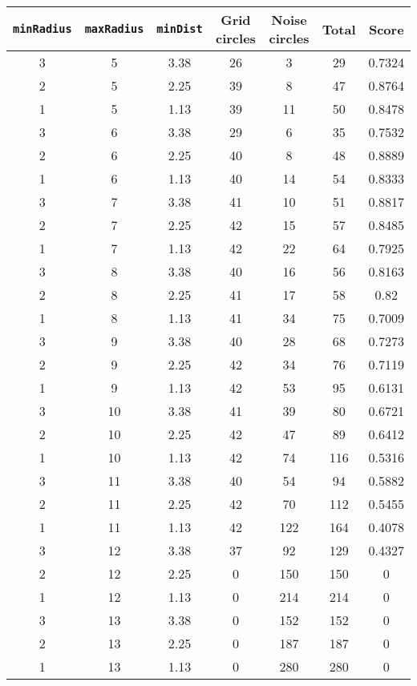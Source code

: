 \documentclass[letterpaper, 12pt]{article}
\begin{document}
\begin{longtable}{|c|c|c|c|c|c|c|}
\hline
\textbf{\texttt{minRadius}} & \textbf{\texttt{maxRadius}} & \textbf{\texttt{minDist}} & \textbf{Grid circles} & \textbf{Noise circles} & \textbf{Total} & \textbf{Score} \\
\hline
3 & 5 & 3.38 & 26 & 3 & 29 & 0.7324 \\
\hline
2 & 5 & 2.25 & 39 & 8 & 47 & 0.8764 \\
\hline
1 & 5 & 1.13 & 39 & 11 & 50 & 0.8478 \\
\hline
3 & 6 & 3.38 & 29 & 6 & 35 & 0.7532 \\
\hline
2 & 6 & 2.25 & 40 & 8 & 48 & 0.8889 \\
\hline
1 & 6 & 1.13 & 40 & 14 & 54 & 0.8333 \\
\hline
3 & 7 & 3.38 & 41 & 10 & 51 & 0.8817 \\
\hline
2 & 7 & 2.25 & 42 & 15 & 57 & 0.8485 \\
\hline
1 & 7 & 1.13 & 42 & 22 & 64 & 0.7925 \\
\hline
3 & 8 & 3.38 & 40 & 16 & 56 & 0.8163 \\
\hline
2 & 8 & 2.25 & 41 & 17 & 58 & 0.82 \\
\hline
1 & 8 & 1.13 & 41 & 34 & 75 & 0.7009 \\
\hline
3 & 9 & 3.38 & 40 & 28 & 68 & 0.7273 \\
\hline
2 & 9 & 2.25 & 42 & 34 & 76 & 0.7119 \\
\hline
1 & 9 & 1.13 & 42 & 53 & 95 & 0.6131 \\
\hline
3 & 10 & 3.38 & 41 & 39 & 80 & 0.6721 \\
\hline
2 & 10 & 2.25 & 42 & 47 & 89 & 0.6412 \\
\hline
1 & 10 & 1.13 & 42 & 74 & 116 & 0.5316 \\
\hline
3 & 11 & 3.38 & 40 & 54 & 94 & 0.5882 \\
\hline
2 & 11 & 2.25 & 42 & 70 & 112 & 0.5455 \\
\hline
1 & 11 & 1.13 & 42 & 122 & 164 & 0.4078 \\
\hline
3 & 12 & 3.38 & 37 & 92 & 129 & 0.4327 \\
\hline
2 & 12 & 2.25 & 0 & 150 & 150 & 0 \\
\hline
1 & 12 & 1.13 & 0 & 214 & 214 & 0 \\
\hline
3 & 13 & 3.38 & 0 & 152 & 152 & 0 \\
\hline
2 & 13 & 2.25 & 0 & 187 & 187 & 0 \\
\hline
1 & 13 & 1.13 & 0 & 280 & 280 & 0 \\

\end{longtable}
\end{document}
